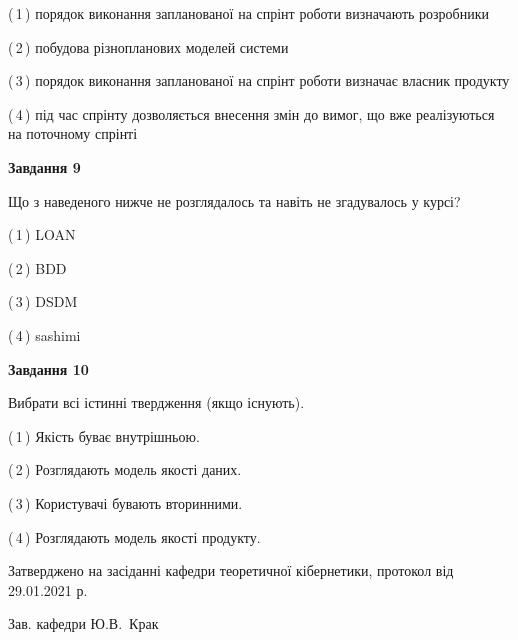 \documentclass[10pt, ukrainian]{article}
\begin{document}
{\begin {large}
(\,1\,) порядок виконання запланованої на спрінт роботи визначають розробники%



(\,2\,) побудова різнопланових моделей системи%



(\,3\,) порядок виконання запланованої на спрінт роботи визначає власник продукту%



(\,4\,) під час спрінту дозволяється внесення змін до вимог, що вже реалізуються на поточному спрінті%


{\begin {center}\textbf{Завдання 9}\end {center}}\par
Що з наведеного нижче не розглядалось та навіть не згадувалось у курсі?\par
\vspace{2mm}



(\,1\,) LOAN%



(\,2\,) BDD%



(\,3\,) DSDM%



(\,4\,) sashimi%


{\begin {center}\textbf{Завдання 10}\end {center}}\par
Вибрати всі істинні твердження (якщо існують).\par
\vspace{2mm}



(\,1\,) Якість буває внутрішньою.%



(\,2\,) Розглядають модель якості даних.%



(\,3\,) Користувачі бувають вторинними.%



(\,4\,) Розглядають модель якості продукту.%



\end {large}}
{\vspace{5mm}\smallskip \begin {small} Затверджено на засіданні кафедри теоретичної кібернетики, протокол  від   29.01.2021 р.\par\smallskip\smallskip
{\parbox {6.5 cm}{Зав. кафедри \dotfill Ю.В.~Крак}} \end{small}}
\newpage
\end{document}
